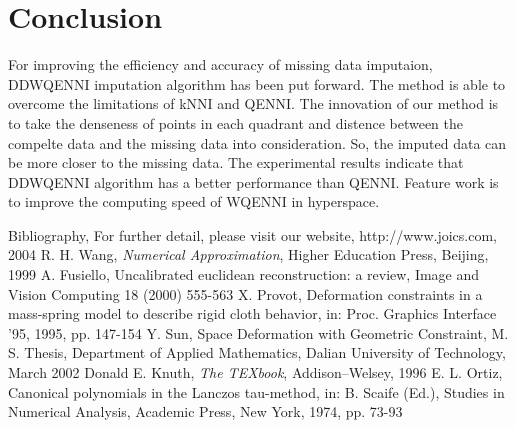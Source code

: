 \documentclass[print]{jicspack}
\begin{document}
\section{Conclusion}
For improving the efficiency and accuracy of missing data imputaion, DDWQENNI imputation algorithm has been put forward. The method is able to overcome the limitations of kNNI and QENNI. The innovation of our method is to take the denseness of points in each quadrant and distence between the compelte data and the missing data into consideration. So, the imputed data can be more closer to the missing data. The experimental results indicate that DDWQENNI algorithm has a better performance than QENNI. Feature work is to improve the computing speed of WQENNI in hyperspace.

\begin{thebibliography}{00}\label{ref:ref}




 Bibliography, For further detail, please visit our
website, http://www.joics.com, 2004
 R. H. Wang, {\it Numerical Approximation}, Higher Education Press, Beijing, 1999
 A. Fusiello, Uncalibrated euclidean reconstruction: a review, Image and Vision Computing 18 (2000) 555-563
 X. Provot, Deformation constraints in a mass-spring model to describe rigid cloth behavior, in: Proc. Graphics Interface '95, 1995, pp. 147-154
 Y. Sun, Space Deformation with Geometric Constraint, M. S. Thesis, Department of Applied Mathematics, Dalian University of Technology, March 2002
 Donald E. Knuth, {\it The TEXbook}, Addison--Welsey, 1996
E. L. Ortiz, Canonical polynomials in the Lanczos tau-method, in: B. Scaife (Ed.), Studies in Numerical Analysis, Academic Press, New York, 1974, pp. 73-93
\end{thebibliography}
\end{document}
